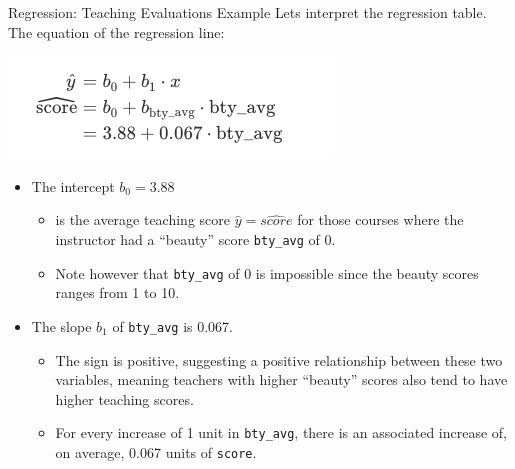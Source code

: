 \documentclass[
  ignorenonframetext,
]{beamer}
\providecommand{\tightlist}{%
  \setlength{\itemsep}{0pt}\setlength{\parskip}{0pt}}
\begin{document}
\begin{frame}[fragile]{Regression: Teaching Evaluations Example}
\protect\hypertarget{regression-teaching-evaluations-example-3}{}
Lets interpret the regression table. The equation of the regression
line:

\begin{center}\includegraphics[width=0.4\linewidth,height=0.2\textheight]{Week4_3} \end{center}

\begin{itemize}
\item
  The intercept \(b_0=3.88\)

  \begin{itemize}
  \tightlist
  \item
    is the average teaching score \(\hat{y}=\widehat{score}\) for those
    courses where the instructor had a ``beauty'' score
    \texttt{bty\_avg} of 0.
  \item
    Note however that \texttt{bty\_avg} of 0 is impossible since the
    beauty scores ranges from 1 to 10.
  \end{itemize}
\item
  The slope \(b_1\) of \texttt{bty\_avg} is 0.067.

  \begin{itemize}
  \tightlist
  \item
    The sign is positive, suggesting a positive relationship between
    these two variables, meaning teachers with higher ``beauty'' scores
    also tend to have higher teaching scores.
  \item
    For every increase of 1 unit in \texttt{bty\_avg}, there is an
    associated increase of, on average, 0.067 units of \texttt{score}.
  \end{itemize}
\end{itemize}
\end{frame}
\end{document}
